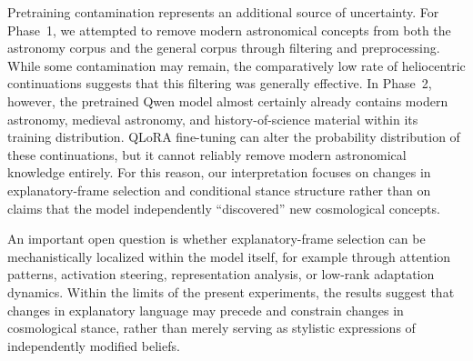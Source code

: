 Pretraining contamination represents an additional source of uncertainty. For Phase~1, we attempted to remove modern astronomical concepts from both the astronomy corpus and the general corpus through filtering and preprocessing. While some contamination may remain, the comparatively low rate of heliocentric continuations suggests that this filtering was generally effective. In Phase~2, however, the pretrained Qwen model almost certainly already contains modern astronomy, medieval astronomy, and history-of-science material within its training distribution. QLoRA fine-tuning can alter the probability distribution of these continuations, but it cannot reliably remove modern astronomical knowledge entirely. For this reason, our interpretation focuses on changes in explanatory-frame selection and conditional stance structure rather than on claims that the model independently ``discovered'' new cosmological concepts.

An important open question is whether explanatory-frame selection can be mechanistically localized within the model itself, for example through attention patterns, activation steering, representation analysis, or low-rank adaptation dynamics. Within the limits of the present experiments, the results suggest that changes in explanatory language may precede and constrain changes in cosmological stance, rather than merely serving as stylistic expressions of independently modified beliefs.
